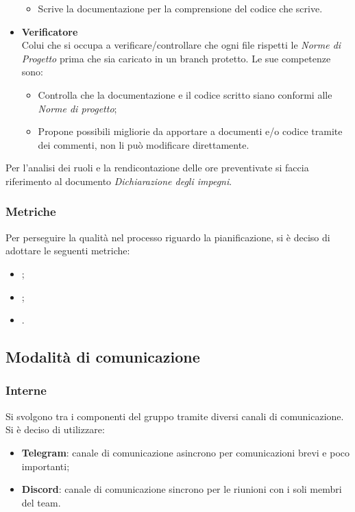 \begin{itemize}
\begin{itemize}
              \item Scrive la documentazione per la comprensione del codice che scrive.
          \end{itemize}
    \item \textbf{Verificatore}\\
          Colui che si occupa a verificare/controllare che ogni file rispetti le \textit{Norme di Progetto} prima che sia caricato in un branch protetto.
          Le sue competenze sono:
          \begin{itemize}
              \item Controlla che la documentazione e il codice scritto siano conformi alle
                    \textit{Norme di progetto};
              \item Propone possibili migliorie da apportare a documenti e/o codice tramite dei
                    commenti, non li può modificare direttamente.
          \end{itemize}
\end{itemize}

Per l'analisi dei ruoli e la rendicontazione delle ore preventivate si faccia
riferimento al documento \textit{Dichiarazione degli impegni}.

\subsubsection{Metriche}
Per perseguire la qualità nel processo riguardo la pianificazione, si è deciso
di adottare le seguenti metriche:
\begin{itemize}
    \item {};
    \item {};
    \item {}.
\end{itemize}

\subsection{Modalità di comunicazione}
\subsubsection{Interne}
Si svolgono tra i componenti del gruppo tramite diversi canali di
comunicazione.\\ Si è deciso di utilizzare:
\begin{itemize}
    \item \textbf{Telegram}: canale di comunicazione asincrono per comunicazioni brevi e poco importanti;
    \item \textbf{Discord}: canale di comunicazione sincrono per le riunioni con i soli membri del team.\\
\end{itemize}
